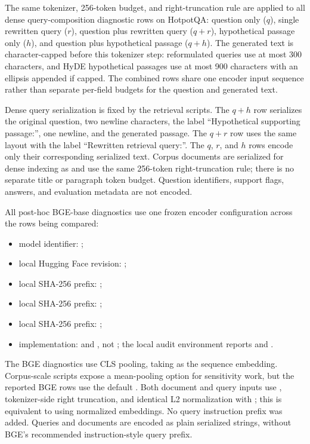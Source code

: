 \documentclass[10pt]{article}
\begin{document}
The same tokenizer, 256-token budget, and right-truncation rule are applied to all dense query-composition diagnostic rows on HotpotQA: question only ($q$), single rewritten query ($r$), question plus rewritten query ($q+r$), hypothetical passage only ($h$), and question plus hypothetical passage ($q+h$). The generated text is character-capped before this tokenizer step: reformulated queries use at most 300 characters, and HyDE hypothetical passages use at most 900 characters with an ellipsis appended if capped. The combined rows share one encoder input sequence rather than separate per-field budgets for the question and generated text.

Dense query serialization is fixed by the retrieval scripts. The $q+h$ row serializes the original question, two newline characters, the label ``Hypothetical supporting passage:'', one newline, and the generated passage. The $q+r$ row uses the same layout with the label ``Rewritten retrieval query:''. The $q$, $r$, and $h$ rows encode only their corresponding serialized text. Corpus documents are serialized for dense indexing as  and use the same 256-token right-truncation rule; there is no separate title or paragraph token budget. Question identifiers, support flags, answers, and evaluation metadata are not encoded.

All post-hoc BGE-base diagnostics use one frozen encoder configuration across the rows being compared:
\begin{itemize}
\item model identifier: ;
\item local Hugging Face  revision: ;
\item local  SHA-256 prefix: ;
\item local  SHA-256 prefix: ;
\item local  SHA-256 prefix: ;
\item implementation:  and , not ; the local audit environment reports  and .
\end{itemize}

The BGE diagnostics use CLS pooling, taking  as the sequence embedding. Corpus-scale scripts expose a mean-pooling option for sensitivity work, but the reported BGE rows use the default . Both document and query inputs use , tokenizer-side right truncation, and identical L2 normalization with ; this is equivalent to using normalized embeddings. No query instruction prefix was added. Queries and documents are encoded as plain serialized strings, without BGE's recommended instruction-style query prefix.
\end{document}
